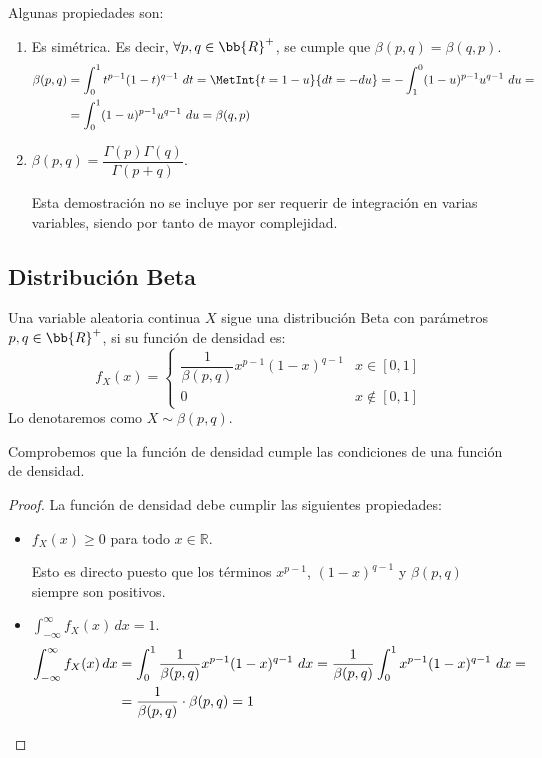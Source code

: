 Algunas propiedades son:
\begin{enumerate}
    \item Es simétrica. Es decir, $\forall p,q\in \bb{R}^+$, se cumple que $\beta(p,q) = \beta(q,p)$.
    \begin{align*}
        \beta(p,q) &= \int_{0}^{1} t^{p-1}(1-t)^{q-1}~dt
        = \MetInt{t=1-u}{dt=-du}
        = -\int_{1}^{0} (1-u)^{p-1}u^{q-1}~du
        =\\&= \int_{0}^{1} (1-u)^{p-1}u^{q-1}~du
        = \beta(q,p)
    \end{align*}

    \item $\beta(p,q) = \dfrac{\Gamma(p)\Gamma(q)}{\Gamma(p+q)}$.
    
    Esta demostración no se incluye por ser requerir de integración en varias variables, siendo por tanto de mayor complejidad.
\end{enumerate}


\subsection{Distribución Beta}

\begin{definicion}
    Una variable aleatoria continua $X$ sigue una distribución Beta con parámetros $p,q\in \bb{R}^+$,
    si su función de densidad es:
    \begin{equation*}
        f_X(x) = \begin{cases}
            \dfrac{1}{\beta(p,q)}x^{p-1}(1-x)^{q-1} & x\in [0,1]\\
            0 & x\notin [0,1]
        \end{cases}
    \end{equation*}
    Lo denotaremos como $X\sim \beta(p,q)$.
\end{definicion}

Comprobemos que la función de densidad cumple las condiciones de una función de densidad.
\begin{proof}
    La función de densidad debe cumplir las siguientes propiedades:
    \begin{itemize}
        \item $f_X(x)\geq 0$ para todo $x\in \mathbb{R}$.
        
        Esto es directo puesto que los términos $x^{p-1}$, $(1-x)^{q-1}$ y $\beta(p,q)$ siempre son positivos.
        
        \item $\displaystyle \int_{-\infty}^{\infty} f_X(x) \, dx = 1$.
        \begin{align*}
            \int_{-\infty}^{\infty} f_X(x) \, dx &= \int_{0}^{1} \dfrac{1}{\beta(p,q)}x^{p-1}(1-x)^{q-1}~dx
            = \dfrac{1}{\beta(p,q)} \int_{0}^{1} x^{p-1}(1-x)^{q-1}~dx
            =\\& = \dfrac{1}{\beta(p,q)}\cdot \beta(p,q) = 1
            \qedhere
        \end{align*}
    \end{itemize}
\end{proof}

